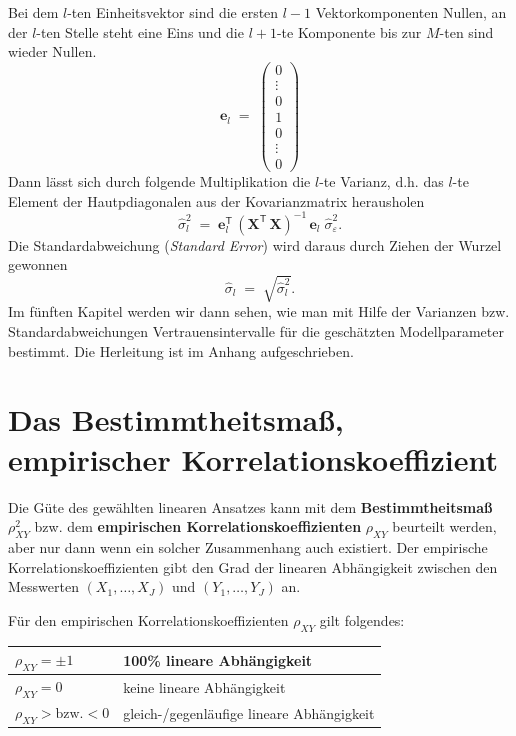 Bei dem $l$-ten Einheitsvektor sind die ersten $l-1$ Vektorkomponenten Nullen, an der $l$-ten Stelle steht eine Eins
und die $l+1$-te Komponente bis zur $M$-ten sind wieder Nullen.
\begin{equation}
\boldsymbol{e}_l \; = \;
\left(\begin{array}{c}
0\\
\vdots\\
0\\
1\\
0\\
\vdots\\
0
\end{array}\right)
\end{equation}
Dann lässt sich durch folgende Multiplikation die $l$-te Varianz, d.h. das $l$-te Element
der Hautpdiagonalen aus der Kovarianzmatrix herausholen
\begin{equation}
\hat \sigma_l^2 \; = \; \boldsymbol{e}_l^\mathsf{T} \, \left( \mathbf{X}^\mathsf{T}  \, \mathbf{X} \right)^{-1} \, \boldsymbol{e}_l  \; \hat \sigma_{\varepsilon}^2 .
\end{equation}
Die Standardabweichung (\textsl{Standard Error}) wird daraus durch Ziehen der Wurzel
gewonnen
\begin{equation}
\hat \sigma_l \; = \; \sqrt{\hat \sigma_l^2} .
\end{equation}
Im fünften Kapitel werden wir dann sehen, wie man mit Hilfe der Varianzen bzw. Standardabweichungen Vertrauensintervalle für die geschätzten Modellparameter bestimmt.
Die Herleitung ist im Anhang aufgeschrieben.

\newpage
\section{Das Bestimmtheitsmaß, empirischer Korrelationskoeffizient}
Die G\"{u}te des gew\"{a}hlten linearen Ansatzes kann mit dem
\textbf{Bestimmtheitsmaß} $\rho_{XY}^2 $ bzw. dem \textbf{empirischen
	Korrelationskoeffizienten} $\rho_{XY}$ beurteilt werden, aber nur dann
wenn ein solcher Zusammenhang auch existiert. Der empirische
Korrelationskoeffizienten gibt den Grad der linearen
Abh\"{a}ngigkeit zwischen den Messwerten $(X_1 ,\ldots ,X_J )$ und
$(Y_1 ,\ldots ,Y_J)$ an. 

Für den empirischen Korrelationskoeffizienten $\rho_{XY}$ gilt folgendes:

\begin{center}
	\begin{tabular}
		{|p{100pt}|p{209pt}|} \hline 
		$\rho_{XY} = \pm 1$&
		100{\%} lineare Abh\"{a}ngigkeit  \\
		\hline $\rho_{XY} = 0$&
		keine lineare Abh\"{a}ngigkeit \\
		\hline $\rho_{XY} > \mbox{bzw.} < 0$&
		gleich-/gegenl\"{a}ufige lineare Abh\"{a}ngigkeit \\
		\hline
	\end{tabular}
\end{center}

